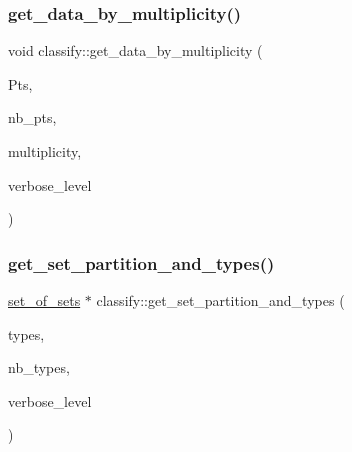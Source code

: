 \subsubsection{\texorpdfstring{get\+\_\+data\+\_\+by\+\_\+multiplicity()}{get\_data\_by\_multiplicity()}}
{\footnotesize\ttfamily void classify\+::get\+\_\+data\+\_\+by\+\_\+multiplicity (\begin{DoxyParamCaption}\item[{\mbox{\hyperlink{galois_8h_a09fddde158a3a20bd2dcadb609de11dc}{I\+NT}} $\ast$\&}]{Pts,  }\item[{\mbox{\hyperlink{galois_8h_a09fddde158a3a20bd2dcadb609de11dc}{I\+NT}} \&}]{nb\+\_\+pts,  }\item[{\mbox{\hyperlink{galois_8h_a09fddde158a3a20bd2dcadb609de11dc}{I\+NT}}}]{multiplicity,  }\item[{\mbox{\hyperlink{galois_8h_a09fddde158a3a20bd2dcadb609de11dc}{I\+NT}}}]{verbose\+\_\+level }\end{DoxyParamCaption})}

\mbox{\label{classclassify_a7ea9543fd72149cd491b2cb57aa113d3}} 
\subsubsection{\texorpdfstring{get\+\_\+set\+\_\+partition\+\_\+and\+\_\+types()}{get\_set\_partition\_and\_types()}}
{\footnotesize\ttfamily \mbox{\hyperlink{classset__of__sets}{set\+\_\+of\+\_\+sets}} $\ast$ classify\+::get\+\_\+set\+\_\+partition\+\_\+and\+\_\+types (\begin{DoxyParamCaption}\item[{\mbox{\hyperlink{galois_8h_a09fddde158a3a20bd2dcadb609de11dc}{I\+NT}} $\ast$\&}]{types,  }\item[{\mbox{\hyperlink{galois_8h_a09fddde158a3a20bd2dcadb609de11dc}{I\+NT}} \&}]{nb\+\_\+types,  }\item[{\mbox{\hyperlink{galois_8h_a09fddde158a3a20bd2dcadb609de11dc}{I\+NT}}}]{verbose\+\_\+level }\end{DoxyParamCaption})}

\mbox{\label{classclassify_afc24c64267d646d1f83ea39a7c66bde3}} 
